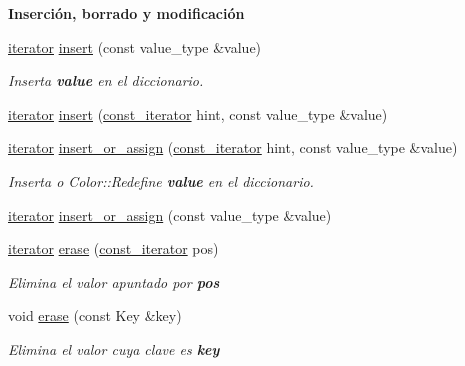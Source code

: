 \begin{Indent}{\bf \-Inserción, borrado y modificación}\par
\begin{DoxyCompactItemize}
\item 
\hyperlink{classaed2_1_1map_1_1iterator}{iterator} \hyperlink{classaed2_1_1map_a60aacba06b1579630b3c8e996cf248c8_a60aacba06b1579630b3c8e996cf248c8}{insert} (const value\-\_\-type \&value)
\begin{DoxyCompactList}\small\item\em \-Inserta {\bfseries value} en el diccionario. \end{DoxyCompactList}\item 
\hyperlink{classaed2_1_1map_1_1iterator}{iterator} \hyperlink{classaed2_1_1map_a6941cde9a79c27f054b5c97a587a1854_a6941cde9a79c27f054b5c97a587a1854}{insert} (\hyperlink{classaed2_1_1map_1_1const__iterator}{const\-\_\-iterator} hint, const value\-\_\-type \&value)
\item 
\hyperlink{classaed2_1_1map_1_1iterator}{iterator} \hyperlink{classaed2_1_1map_a2ef6723c183916276b0afc4a4c721475_a2ef6723c183916276b0afc4a4c721475}{insert\-\_\-or\-\_\-assign} (\hyperlink{classaed2_1_1map_1_1const__iterator}{const\-\_\-iterator} hint, const value\-\_\-type \&value)
\begin{DoxyCompactList}\small\item\em \-Inserta o \-Color\-::\-Redefine {\bfseries value} en el diccionario. \end{DoxyCompactList}\item 
\hyperlink{classaed2_1_1map_1_1iterator}{iterator} \hyperlink{classaed2_1_1map_a9128a806713bcc999ebd8a97ab77e765_a9128a806713bcc999ebd8a97ab77e765}{insert\-\_\-or\-\_\-assign} (const value\-\_\-type \&value)
\item 
\hyperlink{classaed2_1_1map_1_1iterator}{iterator} \hyperlink{classaed2_1_1map_ad8e796bf9c9c558e5ce6b61e116253fe_ad8e796bf9c9c558e5ce6b61e116253fe}{erase} (\hyperlink{classaed2_1_1map_1_1const__iterator}{const\-\_\-iterator} pos)
\begin{DoxyCompactList}\small\item\em \-Elimina el valor apuntado por {\bfseries pos} \end{DoxyCompactList}\item 
void \hyperlink{classaed2_1_1map_a2ffadb42cd5f0bc7b3752ff159b75334_a2ffadb42cd5f0bc7b3752ff159b75334}{erase} (const \-Key \&key)
\begin{DoxyCompactList}\small\item\em \-Elimina el valor cuya clave es {\bfseries key} \end{DoxyCompactList}\item 

\end{DoxyCompactItemize}
\end{Indent}
